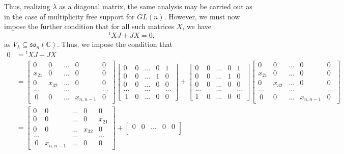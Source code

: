 \documentclass{memoir}
\newcommand{\mf}{\mathfrak}
\newcommand{\bc}{\mathbb{C}}
\theoremstyle{definition}
\begin{document}
	Thus, realizing $\lambda$ as a diagonal matrix, the same analysis may be carried out as in the case of multiplicity free support for $GL(n)$.  
	However, we must now impose the further condition that for all such matrices $X$, we have
	$${}^tXJ+JX=0,$$
	as $V_\lambda\subseteq\mf{so}_n(\bc)$.  
	Thus, we impose the condition that 
	\begin{align*}
		0&={}^tXJ+JX\\
		&=\begin{bmatrix}
			0 & 0 & ... & 0 & 0 \\
			x_{21} & 0 & ... & 0 & 0 \\
			0 & x_{32} & ... & 0 & 0 \\
			... & & ... & & ...\\\
			0 & 0 & ... & x_{n, n-1} & 0
		\end{bmatrix}\begin{bmatrix}
		0 & 0 & ... & 0 & 1 \\
		0 & 0 & ... & 1 & 0 \\
		0 & 0 & ... & 0 & 0 \\
		... & & ... & & ...\\\
		1 & 0 & ... & 0 & 0
	\end{bmatrix}+\begin{bmatrix}
	0 & 0 & ... & 0 & 1 \\
	0 & 0 & ... & 1 & 0 \\
	0 & 0 & ... & 0 & 0 \\
	... & & ... & & ...\\
	1 & 0 & ... & 0 & 0
\end{bmatrix}\begin{bmatrix}
0 & 0 & ... & 0 & 0 \\
x_{21} & 0 & ... & 0 & 0 \\
0 & x_{32} & ... & 0 & 0 \\
... & & ... & & ...\\\
0 & 0 & ... & x_{n, n-1} & 0
\end{bmatrix}\\
&=\begin{bmatrix}
	0 & 0 & ... & 0 & 0 \\
	0 & 0 & ... & 0 & x_{21} \\
	0 & 0 & ... & x_{32} & 0 \\
	... & & ... & & ...\\\
	0 & x_{n, n-1} & ... & 0 & 0
\end{bmatrix}+\begin{bmatrix}
0 & 0 & ... & 0 & 0 \\

\end{bmatrix}
\end{align*}
\end{document}
